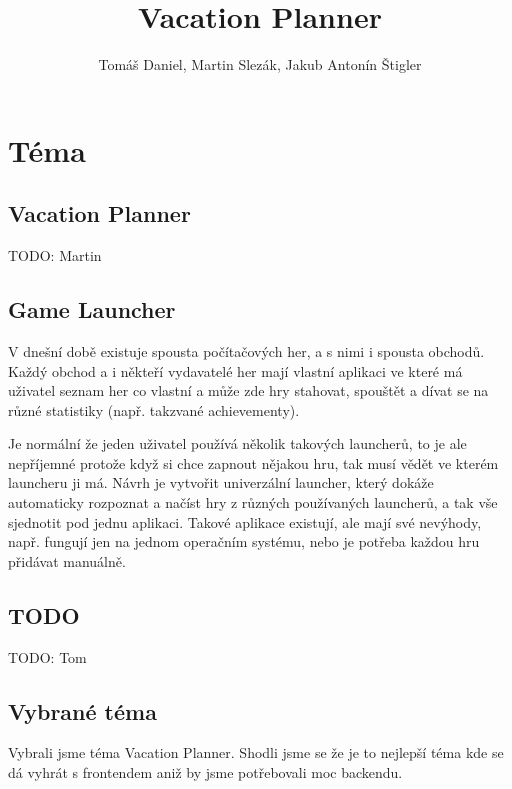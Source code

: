 \documentclass{article}
\title{Vacation Planner}
\author{Tomáš Daniel, Martin Slezák, Jakub Antonín Štigler}
\begin{document}
\maketitle

\newpage

\section{Téma}

\subsection{Vacation Planner}
TODO: Martin

\subsection{Game Launcher}
V dnešní době existuje spousta počítačových her, a s nimi i spousta obchodů.
Každý obchod a i někteří vydavatelé her mají vlastní aplikaci ve které má
uživatel seznam her co vlastní a může zde hry stahovat, spouštět a dívat se na
různé statistiky (např. takzvané achievementy).

Je normální že jeden uživatel používá několik takových launcherů, to je ale
nepříjemné protože když si chce zapnout nějakou hru, tak musí vědět ve kterém
launcheru ji má. Návrh je vytvořit univerzální launcher, který dokáže
automaticky rozpoznat a načíst hry z různých používaných launcherů, a tak vše
sjednotit pod jednu aplikaci. Takové aplikace existují, ale mají své nevýhody,
např. fungují jen na jednom operačním systému, nebo je potřeba každou hru
přidávat manuálně.

\subsection{TODO}
TODO: Tom

\subsection{Vybrané téma}
Vybrali jsme téma Vacation Planner. Shodli jsme se že je to nejlepší téma kde
se dá vyhrát s frontendem aniž by jsme potřebovali moc backendu.
\end{document}
